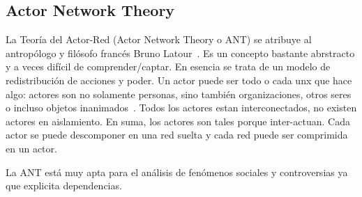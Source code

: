 \subsection{Actor Network Theory}

La Teoría del Actor-Red (Actor Network Theory o ANT) se atribuye al antropólogo y filósofo francés Bruno Latour~\autocite{Latour2010}.
Es un concepto bastante abrstracto y a veces difícil de comprender/captar.
En esencia se trata de un modelo de redistribución de acciones y poder.
Un actor puede ser todo o cada unx que hace algo: actores son no solamente personas, sino también organizaciones, otros seres o incluso objetos inanimados~\autocite{Venturini2010b}.
Todos los actores estan interconectados, no existen actores en aislamiento.
En suma, los actores son tales porque inter-actuan.
Cada actor se puede descomponer en una red suelta y cada red puede ser comprimida en un actor.

La ANT está muy apta para el análisis de fenómenos sociales y controversias ya que explicita dependencias.

